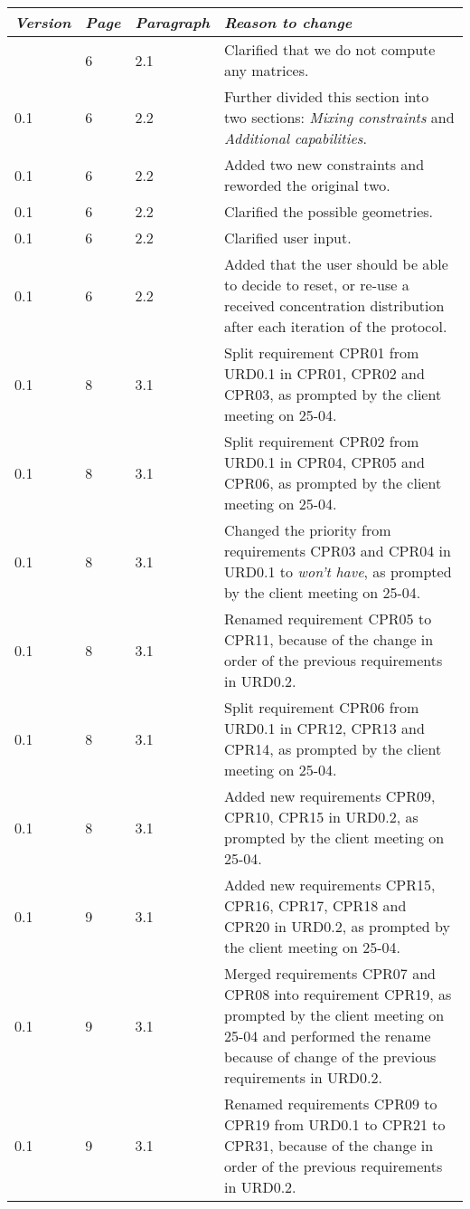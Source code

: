 \begin{longtable}{|l|l|l|p{11cm}|}
    \hline
    \emph{Version} & \emph{Page} &   \emph{Paragraph}    &   \emph{Reason to change}\\
    \hline
    \endhead
    \hline
    \endfoot
     0.1 & 6 & 2.1 & Clarified that we do not compute any matrices. \\
     0.1 & 6 & 2.2 & Further divided this section into two sections: \emph{Mixing constraints} and \emph{Additional capabilities}. \\
     0.1 & 6 & 2.2 & Added two new constraints and reworded the original two. \\
     0.1 & 6 & 2.2 & Clarified the possible geometries. \\
     0.1 & 6 & 2.2 & Clarified user input. \\
     0.1 & 6 & 2.2 & Added that the user should be able to decide to reset, or re-use a received concentration distribution after each iteration of the protocol. \\
     0.1 & 8 & 3.1 & Split requirement CPR01 from URD0.1 in CPR01, CPR02 and CPR03, as prompted by the client meeting on 25-04. \\
     0.1 & 8 & 3.1 & Split requirement CPR02 from URD0.1 in CPR04, CPR05 and CPR06, as prompted by the client meeting on 25-04. \\
     0.1 & 8 & 3.1 & Changed the priority from requirements CPR03 and CPR04 in URD0.1 to \emph{won't have}, as prompted by the client meeting on 25-04. \\
     0.1 & 8 & 3.1 & Renamed requirement CPR05 to CPR11, because of the change in order of the previous requirements in URD0.2. \\
     0.1 & 8 & 3.1 & Split requirement CPR06 from URD0.1 in CPR12, CPR13 and CPR14, as prompted by the client meeting on 25-04. \\
     0.1 & 8 & 3.1 & Added new requirements CPR09, CPR10, CPR15 in URD0.2, as prompted by the client meeting on 25-04.  \\
     0.1 & 9 & 3.1 & Added new requirements CPR15, CPR16, CPR17, CPR18 and CPR20 in URD0.2, as prompted by the client meeting on 25-04.\\
     0.1 & 9 & 3.1 & Merged requirements CPR07 and CPR08 into requirement CPR19, as prompted by the client meeting on 25-04 and performed the rename because of change of the previous requirements in URD0.2. \\
    0.1 & 9 & 3.1 & Renamed requirements CPR09 to CPR19 from URD0.1 to CPR21 to CPR31, because of the change in order of the previous requirements in URD0.2. \\

\end{longtable}
